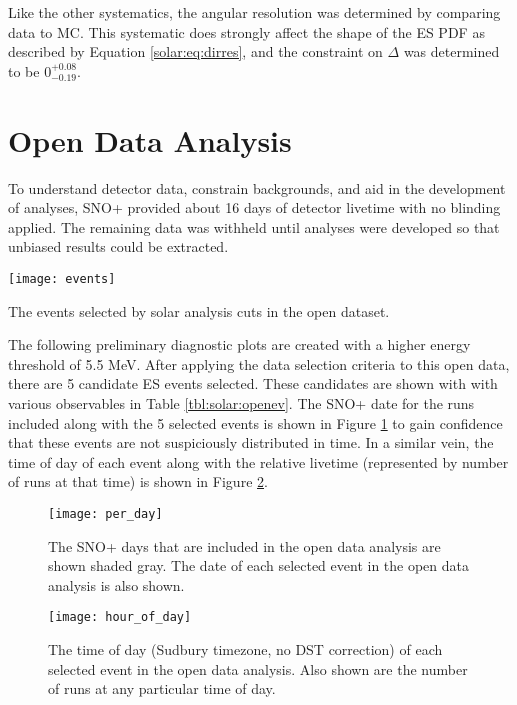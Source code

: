 Like the other systematics, the angular resolution was determined by comparing \N data to MC. 
This systematic does strongly affect the shape of the ES PDF as described by Equation \ref{solar:eq:dirres}, and the constraint on $\Delta$ was determined to be $0^{+0.08}_{-0.19}$.

\section{Open Data Analysis}
\label{sec:solar:opendata}

To understand detector data, constrain backgrounds, and aid in the development of analyses, SNO+ provided about 16 days of detector livetime with no blinding applied.
The remaining data was withheld until analyses were developed so that unbiased results could be extracted.

\begin{table}
\centering
\texttt{[image: events]}
\caption{The events selected by solar analysis cuts in the open dataset.}
\label{tbl:solar:openev}
\end{table}

The following preliminary diagnostic plots are created with a higher energy threshold of 5.5 MeV.
After applying the data selection criteria to this open data, there are 5 candidate ES events selected.
These candidates are shown with with various observables in Table \ref{tbl:solar:openev}.
The SNO+ date for the runs included along with the 5 selected events is shown in Figure \ref{fig:solar:opendata} to gain confidence that these events are not suspiciously distributed in time.
In a similar vein, the time of day of each event along with the relative livetime (represented by number of runs at that time) is shown in Figure \ref{fig:solar:tod}.

\begin{figure}
\centering
\texttt{[image: per\_day]}
\caption{The SNO+ days that are included in the open data analysis are shown
         shaded gray.
         The date of each selected event in the open data analysis is also shown.}
\label{fig:solar:opendata}
\end{figure}


\begin{figure}
\centering
\texttt{[image: hour\_of\_day]}
\caption{The time of day (Sudbury timezone, no DST correction) of each selected
         event in the open data analysis.
         Also shown are the number of runs at any particular time of day.}
\label{fig:solar:tod}
\end{figure}


